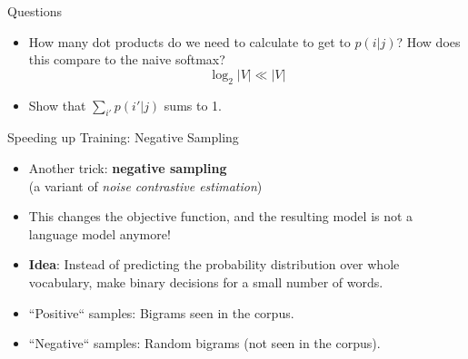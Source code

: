
\begin{vbframe}{Questions}

\vfill

\begin{itemize}
	\item \ques How many dot products do we need to calculate to get to $p(i|j)$? How does this compare to the naive softmax?
		 $$\log_2|V| \ll |V|$$

	\vskip5mm
	\item \ques Show that $\sum_{i'} p(i'|j)$ sums to 1.
\end{itemize}

\vfill

\end{vbframe}


\begin{vbframe}{Speeding up Training: Negative Sampling}

\vfill

\begin{itemize}
	\item Another trick: \textbf{negative sampling}\\ (a variant of \emph{noise contrastive estimation})
	\item This changes the objective function, and the resulting model is not a language model anymore!
	\item \textbf{Idea}: Instead of predicting the probability distribution over whole vocabulary, make binary decisions for a small number of words.
	\item ``Positive`` samples: Bigrams seen in the corpus.
	\item ``Negative`` samples: Random bigrams (not seen in the corpus).
\end{itemize}

\vfill

\end{vbframe}


